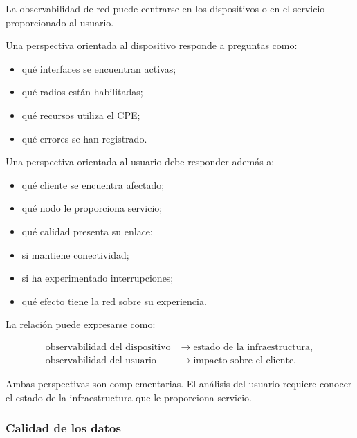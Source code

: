 La observabilidad de red puede centrarse en los dispositivos o en el
servicio proporcionado al usuario.

Una perspectiva orientada al dispositivo responde a preguntas como:

\begin{itemize}
    \item qué interfaces se encuentran activas;

    \item qué radios están habilitadas;

    \item qué recursos utiliza el CPE;

    \item qué errores se han registrado.
\end{itemize}

Una perspectiva orientada al usuario debe responder además a:

\begin{itemize}
    \item qué cliente se encuentra afectado;

    \item qué nodo le proporciona servicio;

    \item qué calidad presenta su enlace;

    \item si mantiene conectividad;

    \item si ha experimentado interrupciones;

    \item qué efecto tiene la red sobre su experiencia.
\end{itemize}

La relación puede expresarse como:

\[
\begin{aligned}
    \text{observabilidad del dispositivo}
    &\longrightarrow
    \text{estado de la infraestructura},\\
    \text{observabilidad del usuario}
    &\longrightarrow
    \text{impacto sobre el cliente}.
\end{aligned}
\]

Ambas perspectivas son complementarias. El análisis del usuario requiere
conocer el estado de la infraestructura que le proporciona servicio.


\subsubsection*{Calidad de los datos}

